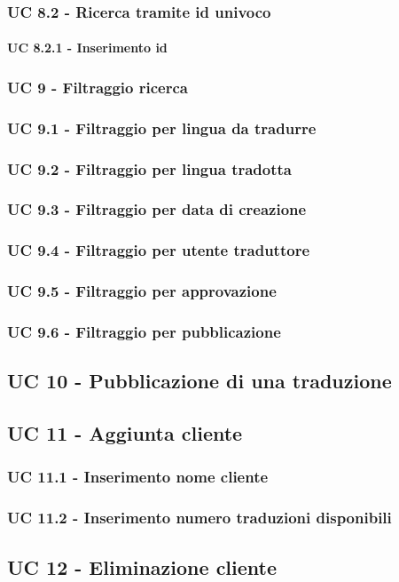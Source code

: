     \subsubsection*{UC 8.2 - Ricerca tramite id univoco}
        \paragraph*{UC 8.2.1 - Inserimento id}
\subsubsection*{UC 9 - Filtraggio ricerca}
    \subsubsection*{UC 9.1 - Filtraggio per lingua da tradurre}
    \subsubsection*{UC 9.2 - Filtraggio per lingua tradotta}
    \subsubsection*{UC 9.3 - Filtraggio per data di creazione}
    \subsubsection*{UC 9.4 - Filtraggio per utente traduttore}
    \subsubsection*{UC 9.5 - Filtraggio per approvazione}
    \subsubsection*{UC 9.6 - Filtraggio per pubblicazione}
\subsection*{UC 10 - Pubblicazione di una traduzione} %
\subsection*{UC 11 - Aggiunta cliente}
    \subsubsection*{UC 11.1 - Inserimento nome cliente}
    \subsubsection*{UC 11.2 - Inserimento numero traduzioni disponibili}
\subsection*{UC 12 - Eliminazione cliente}

